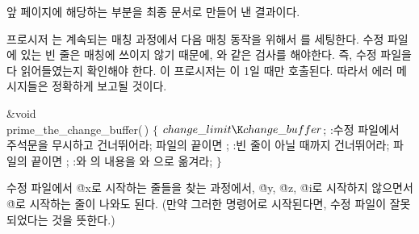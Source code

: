 {\def\inote#1#2#3.{\Y\noindent{\hangindent2em%
  \baselineskip10pt\eightrm\hfontsize{7pt}%
    #1~\ifacro{\pdfnote#3.}\else#3\fi#2.\par}}
\def\U{\inote{이 코드는}{번 섹션에서 사용됩니다}}

\def\runninghead{\headlinefont 부록 A --- 최종 문서}

앞 페이지에 해당하는 부분을 최종 문서로 만들어 낸 결과이다.

{
\baselineskip13pt \hfontsize{9pt}
프로시저 는 계속되는 매칭 과정에서 다음 
매칭 동작을 위해서 를 세팅한다. 수정 파일에 있는 빈 줄은 매칭에
쓰이지 않기 때문에, 와 같은 검사를 해야한다. 즉, 수정 파일을 다 읽어들였는지 확인해야 한다. 
이 프로시저는 이 1일 때만 호출된다. 
따라서 에러 메시지들은 정확하게 보고될 것이다.

\Y\B\&{void} \\{prime\_the\_change\_buffer}(\,)\1\1\2\2\6
${}\{{}$\1\6
${}\\{change\_limit}\K\\{change\_buffer}{}$;\6
:수정 파일에서 주석문을 무시하고 건너뛰어라; 파일의 끝이면 \X;\6
:빈 줄이 아닐 때까지 건너뛰어라; 파일의 끝이면 \X;\6
:와 의 내용을 와 %
으로 옮겨라\X;\6
\4${}\}{}$\2\par
\fi

수정 파일에서 \.{@x}로 시작하는 줄들을 찾는 과정에서, \.{@y}, \.{@z}, \.{@i}로 
시작하지 않으면서 \.{@}로 시작하는 줄이 나와도 된다. (만약 그러한 명령어로 시작된다면, 
수정 파일이 잘못되었다는 것을 뜻한다.)

}}
